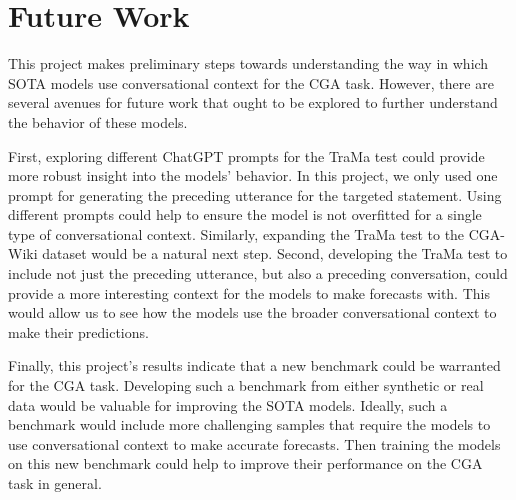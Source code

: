 \section{Future Work}

This project makes preliminary steps towards understanding the way in which SOTA models use conversational context for the CGA task.
However, there are several avenues for future work that ought to be explored to further understand the behavior of these models.

First, exploring different ChatGPT prompts for the TraMa test could provide more robust insight into the models' behavior.
In this project, we only used one prompt for generating the preceding utterance for the targeted statement.
Using different prompts could help to ensure the model is not overfitted for a single type of conversational context.
Similarly, expanding the TraMa test to the CGA-Wiki dataset would be a natural next step.
Second, developing the TraMa test to include not just the preceding utterance, but also a preceding conversation, could provide a more interesting context for the models to make forecasts with.
This would allow us to see how the models use the broader conversational context to make their predictions.

Finally, this project's results indicate that a new benchmark could be warranted for the CGA task.
Developing such a benchmark from either synthetic or real data would be valuable for improving the SOTA models.
Ideally, such a benchmark would include more challenging samples that require the models to use conversational context to make accurate forecasts.
Then training the models on this new benchmark could help to improve their performance on the CGA task in general.
